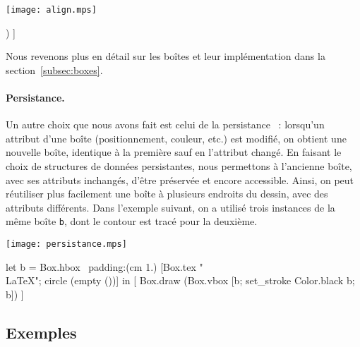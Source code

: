 \documentclass[twoside]{studia-Hermann}
\begin{document}
\medskip
\begin{minipage}{0.2\linewidth}
  \texttt{[image: align.mps]}
\end{minipage}
\begin{minipage}{0.8\linewidth}
\small\begin{ocaml}
[ Box.draw (Box.hbox ~padding:(cm 1.) 
                     [Box.tex "\\LaTeX"; circle (empty ())]) ]
\end{ocaml}
\end{minipage}

\medskip\noindent Nous revenons plus en détail sur les boîtes et leur
implémentation dans la section~\ref{subsec:boxes}.

\paragraph{Persistance.}
Un autre choix que nous avons fait est celui de la
persistance~\cite{persistance} : 
lorsqu'un attribut d'une boîte (positionnement, couleur, etc.) est
modifié, on obtient une nouvelle boîte, identique à la première sauf
en l'attribut changé. En faisant le choix de structures de données
persistantes, nous permettons à l'ancienne boîte, avec ses attributs
inchangés, d'être préservée et encore accessible. Ainsi, on peut
réutiliser plus facilement une boîte à plusieurs endroits
du dessin, avec des attributs différents. Dans l'exemple suivant, on a
utilisé trois instances de la même boîte \texttt{b}, dont le contour
est tracé pour la deuxième.

\medskip
\begin{minipage}{0.2\linewidth}
  \texttt{[image: persistance.mps]}
\end{minipage}
\begin{minipage}{0.8\linewidth}
\small\begin{ocaml}
let b = 
  Box.hbox ~padding:(cm 1.) [Box.tex "\\LaTeX"; circle (empty ())] in
[ Box.draw (Box.vbox [b; set_stroke Color.black b; b]) ]
\end{ocaml}
\end{minipage}


\subsection{Exemples}
\end{document}

